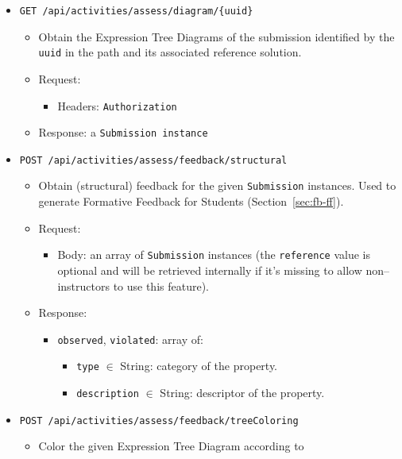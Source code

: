 \begin{chapterBody}
\begin{itemize}
    \item \texttt{GET /api/activities/assess/diagram/\{uuid\}}
    \begin{itemize}
        \item Obtain the Expression Tree Diagrams of the submission 
identified by the \texttt{uuid} in the path and its associated reference
solution.
        \item Request:
        \begin{itemize}
            \item Headers: \texttt{Authorization}
        \end{itemize}
        \item Response: a \texttt{Submission instance}
    \end{itemize}
    \item \texttt{POST /api/activities/assess/feedback/structural}
    \begin{itemize}
        \item Obtain (structural) feedback for the given \texttt{Submission}
instances. Used to generate Formative Feedback for Students
(Section~\ref{sec:fb-ff}).
        \item Request:
        \begin{itemize}
            \item Body: an array of \texttt{Submission} instances
(the \texttt{reference} value is optional and will be retrieved
internally if it's missing to allow non–instructors to use this
feature).
        \end{itemize}
        \item Response:
        \begin{itemize}
            \item \texttt{observed}, \texttt{violated}: array of:
            \begin{itemize}
                \item \texttt{type} $ \in $ String: category of the
property.
                \item \texttt{description} $ \in $ String: descriptor
of the property.
            \end{itemize}
        \end{itemize}
    \end{itemize}
    \item \texttt{POST /api/activities/assess/feedback/treeColoring}
    \begin{itemize}
        \item Color the given Expression Tree Diagram according to

\end{itemize}
\end{itemize}
\end{chapterBody}
